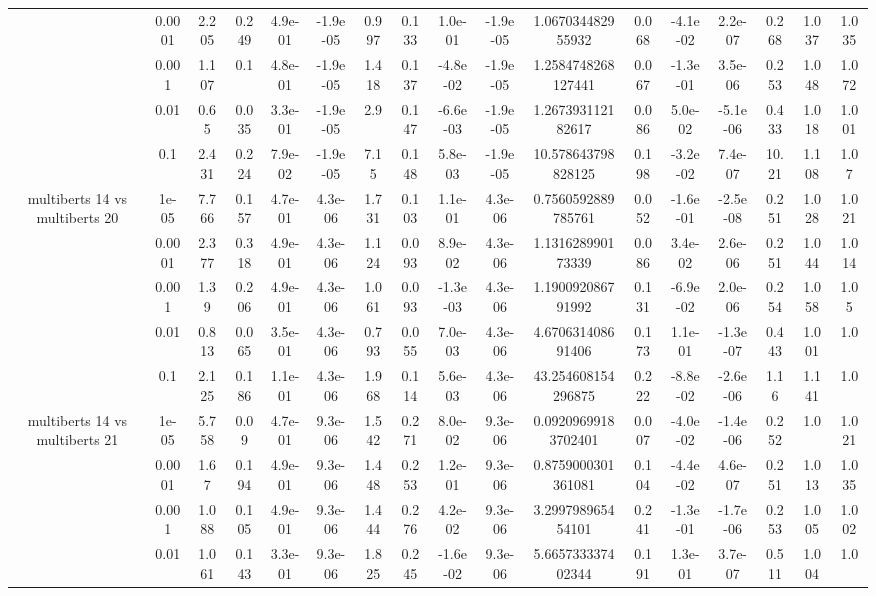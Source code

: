\begin{tabular}{|c|c|c|c|c|c|c|c|c|c|c|c|c|c|c|c|c|}
 & 0.0001 & 2.205 & 0.249 & 4.9e-01 & -1.9e-05 & 0.997 & 0.133 & 1.0e-01 & -1.9e-05 & 1.067034482955932 & 0.068 & -4.1e-02 & 2.2e-07 & 0.268 & 1.037 & 1.035 \\
 & 0.001 & 1.107 & 0.1 & 4.8e-01 & -1.9e-05 & 1.418 & 0.137 & -4.8e-02 & -1.9e-05 & 1.2584748268127441 & 0.067 & -1.3e-01 & 3.5e-06 & 0.253 & 1.048 & 1.072 \\
 & 0.01 & 0.65 & 0.035 & 3.3e-01 & -1.9e-05 & 2.9 & 0.147 & -6.6e-03 & -1.9e-05 & 1.267393112182617 & 0.086 & 5.0e-02 & -5.1e-06 & 0.433 & 1.018 & 1.001 \\
 & 0.1 & 2.431 & 0.224 & 7.9e-02 & -1.9e-05 & 7.15 & 0.148 & 5.8e-03 & -1.9e-05 & 10.578643798828125 & 0.198 & -3.2e-02 & 7.4e-07 & 10.21 & 1.108 & 1.07 \\
\hline
\multirow{5}{*}{multiberts 14 vs multiberts 20} & 1e-05 & 7.766 & 0.157 & 4.7e-01 & 4.3e-06 & 1.731 & 0.103 & 1.1e-01 & 4.3e-06 & 0.7560592889785761 & 0.052 & -1.6e-01 & -2.5e-08 & 0.251 & 1.028 & 1.021 \\
 & 0.0001 & 2.377 & 0.318 & 4.9e-01 & 4.3e-06 & 1.124 & 0.093 & 8.9e-02 & 4.3e-06 & 1.131628990173339 & 0.086 & 3.4e-02 & 2.6e-06 & 0.251 & 1.044 & 1.014 \\
 & 0.001 & 1.39 & 0.206 & 4.9e-01 & 4.3e-06 & 1.061 & 0.093 & -1.3e-03 & 4.3e-06 & 1.190092086791992 & 0.131 & -6.9e-02 & 2.0e-06 & 0.254 & 1.058 & 1.05 \\
 & 0.01 & 0.813 & 0.065 & 3.5e-01 & 4.3e-06 & 0.793 & 0.055 & 7.0e-03 & 4.3e-06 & 4.670631408691406 & 0.173 & 1.1e-01 & -1.3e-07 & 0.443 & 1.001 & 1.0 \\
 & 0.1 & 2.125 & 0.186 & 1.1e-01 & 4.3e-06 & 1.968 & 0.114 & 5.6e-03 & 4.3e-06 & 43.254608154296875 & 0.222 & -8.8e-02 & -2.6e-06 & 1.16 & 1.141 & 1.0 \\
\hline
\multirow{5}{*}{multiberts 14 vs multiberts 21} & 1e-05 & 5.758 & 0.09 & 4.7e-01 & 9.3e-06 & 1.542 & 0.271 & 8.0e-02 & 9.3e-06 & 0.09209699183702401 & 0.007 & -4.0e-02 & -1.4e-06 & 0.252 & 1.0 & 1.021 \\
 & 0.0001 & 1.67 & 0.194 & 4.9e-01 & 9.3e-06 & 1.448 & 0.253 & 1.2e-01 & 9.3e-06 & 0.8759000301361081 & 0.104 & -4.4e-02 & 4.6e-07 & 0.251 & 1.013 & 1.035 \\
 & 0.001 & 1.088 & 0.105 & 4.9e-01 & 9.3e-06 & 1.444 & 0.276 & 4.2e-02 & 9.3e-06 & 3.299798965454101 & 0.241 & -1.3e-01 & -1.7e-06 & 0.253 & 1.005 & 1.002 \\
 & 0.01 & 1.061 & 0.143 & 3.3e-01 & 9.3e-06 & 1.825 & 0.245 & -1.6e-02 & 9.3e-06 & 5.665733337402344 & 0.191 & 1.3e-01 & 3.7e-07 & 0.511 & 1.004 & 1.0 \\

\end{tabular}
